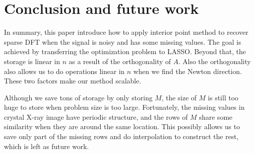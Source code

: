 \documentclass[final,onefignum,onetabnum]{siamart190516}
\begin{document}
\section{Conclusion and future work}\label{sec:conclusions} In summary, this paper introduce how to apply interior point method to recover sparse DFT when the signal is noisy and has some missing values. The goal is achieved by transferring the optimization problem to LASSO. Beyond that, the storage is linear in $n$ as a result of the orthogonality of $A$. Also the orthogonality also allows us to do operations linear in $n$ when we find the Newton direction. These two factors make our method scalable.

Although we save tons of storage by only storing $M$, the size of $M$ is still too huge to store when problem size is too large. Fortunately, the missing values in crystal X-ray image have periodic structure, and the rows of $M$ share some similarity when they are around the same location. This possibly allows us to save only part of the missing rows and do interpolation to construct the rest, which is left as future work.



\end{document}
